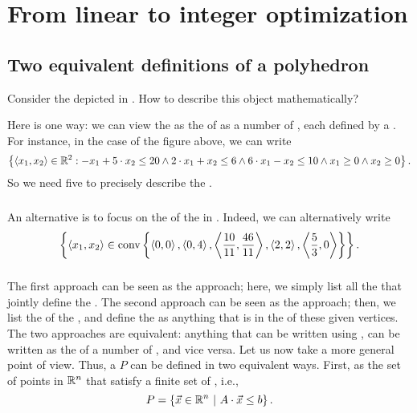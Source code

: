 \chapter{From linear to integer optimization}

\section{Two equivalent definitions of a polyhedron}

Consider the  depicted in . How to describe this object mathematically?


Here is one way: we can view the  as the  of as a number of , each  defined by a . For instance, in the case of the figure above, we can write
\begin{equation}
\left\{ \left\langle x_1,x_2 \right\rangle\in\mathbb{R}^2: -x_1+5\cdot x_2\leq 20 \wedge 2\cdot x_1+x_2\leq 6\wedge 6\cdot x_1-x_2\leq 10\wedge x_1\geq 0\wedge x_2\geq 0 \right\}.
\end{equation}
So we need five  to precisely describe the .

\paragraph{}
An alternative is to focus on the  of the  in . Indeed, we can alternatively write
\begin{equation}
\left\{ \left\langle x_1,x_2 \right\rangle\in\mbox{conv}\left\{ \left\langle 0,0 \right\rangle,\left\langle 0,4 \right\rangle,\left\langle \frac{10}{11},\frac{46}{11} \right\rangle,\left\langle 2,2 \right\rangle,\left\langle \frac{5}{3},0 \right\rangle \right\} \right\}.
\end{equation}

\paragraph{}
The first approach can be seen as the  approach; here, we simply list all the  that jointly define the . The second approach can be seen as the  approach; then, we list the  of the , and define the  as anything that is in the  of these given vertices. The two approaches are equivalent: anything that can be written using , can be written as the  of a number of , and vice versa. Let us now take a more general point of view. Thus, a  $P$ can be defined in two equivalent ways. First, as the set of points in $\mathbb{R}^n$ that satisfy a finite set of , i.e.,
\begin{equation}
P=\left\{ \vec{x}\in\mathbb{R}^n\ |\ A\cdot\vec{x}\leq b \right\}.
\end{equation}

